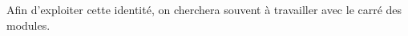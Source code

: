 \documentclass{magnoliaold}
\begin{document}
\begin{remarqueUnique}
\remarque Afin d'exploiter cette identité, on cherchera souvent à travailler avec le carré des modules.
\end{remarqueUnique}

\end{document}
